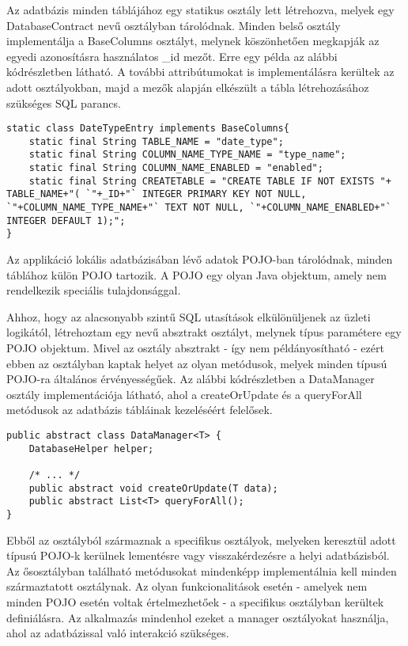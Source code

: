 Az adatbázis minden táblájához egy statikus osztály lett létrehozva, melyek egy DatabaseContract nevű osztályban tárolódnak.
Minden belső osztály implementálja a BaseColumns osztályt, melynek köszönhetően megkapják az egyedi azonosításra használatos  \_id mezőt.
Erre egy példa az alábbi kódrészletben látható.
A további attribútumokat is implementálásra kerültek az adott osztályokban, majd a mezők alapján elkészült a tábla létrehozásához szükséges SQL parancs.
\begin{lstlisting}
static class DateTypeEntry implements BaseColumns{
	static final String TABLE_NAME = "date_type";
	static final String COLUMN_NAME_TYPE_NAME = "type_name";
	static final String COLUMN_NAME_ENABLED = "enabled";
	static final String CREATETABLE = "CREATE TABLE IF NOT EXISTS "+ TABLE_NAME+"( `"+_ID+"` INTEGER PRIMARY KEY NOT NULL, `"+COLUMN_NAME_TYPE_NAME+"` TEXT NOT NULL, `"+COLUMN_NAME_ENABLED+"` INTEGER DEFAULT 1);";
}
\end{lstlisting}

Az applikáció lokális adatbázisában lévő adatok POJO-ban tárolódnak, minden táblához külön POJO tartozik.
A POJO egy olyan Java objektum, amely nem rendelkezik speciális tulajdonsággal.

Ahhoz, hogy az alacsonyabb szintű SQL utasítások elkülönüljenek az üzleti logikától, létrehoztam egy  nevű absztrakt osztályt, melynek típus paramétere egy POJO objektum. 
Mivel az osztály absztrakt - így nem példányosítható - ezért ebben az osztályban kaptak helyet az olyan metódusok, melyek minden típusú POJO-ra általános érvényességűek. 
Az alábbi kódrészletben a DataManager osztály implementációja látható, ahol a createOrUpdate és a queryForAll metódusok az adatbázis tábláinak kezeléséért felelősek.
\begin{lstlisting}
public abstract class DataManager<T> {	
    DatabaseHelper helper;
	
	/* ... */
    public abstract void createOrUpdate(T data);
    public abstract List<T> queryForAll();
}
\end{lstlisting} 
Ebből az osztályból származnak a specifikus osztályok, melyeken keresztül adott típusú POJO-k kerülnek lementésre vagy visszakérdezésre a helyi adatbázisból.
Az ősosztályban található metódusokat mindenképp implementálnia kell minden származtatott osztálynak. 
Az olyan funkcionalitások esetén - amelyek nem minden POJO esetén voltak értelmezhetőek - a specifikus osztályban kerültek definiálásra.
Az alkalmazás mindenhol ezeket a manager osztályokat használja, ahol az adatbázissal való interakció szükséges.


